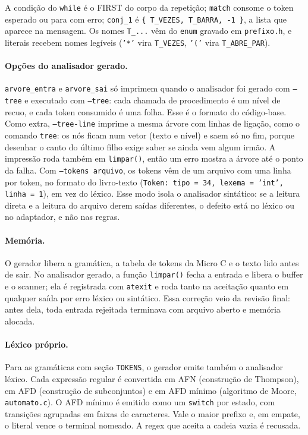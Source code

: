 \documentclass[11pt,a4paper]{article}
\begin{document}
\noindent A condição do \texttt{while} é o FIRST do corpo da repetição; \texttt{match} consome o
token esperado ou para com erro; \texttt{conj\_1} é \texttt{\{ T\_VEZES, T\_BARRA, -1 \}}, a
lista que aparece na mensagem. Os nomes \texttt{T\_...} vêm do \texttt{enum} gravado em
\texttt{prefixo.h}, e literais recebem nomes legíveis (\texttt{'*'} vira \texttt{T\_VEZES},
\texttt{'('} vira \texttt{T\_ABRE\_PAR}).

\paragraph{Opções do analisador gerado.} \texttt{arvore\_entra} e \texttt{arvore\_sai} só imprimem
quando o analisador foi gerado com \texttt{--tree} e executado com \texttt{--tree}: cada chamada de
procedimento é um nível de recuo, e cada token consumido é uma folha. Esse é o formato do
código-base. Como extra, \texttt{--tree-line} imprime a mesma árvore com linhas de ligação, como
o comando \texttt{tree}: os nós ficam num vetor (texto e nível) e saem só no fim, porque desenhar o
canto do último filho exige saber se ainda vem algum irmão. A impressão roda também em
\texttt{limpar()}, então um erro mostra a árvore até o ponto da falha. Com \texttt{--tokens
arquivo}, os tokens vêm de um arquivo com uma linha por token, no formato do livro-texto
(\texttt{Token: tipo = 34, lexema = 'int', linha = 1}), em vez do léxico. Esse modo isola o
analisador sintático: se a leitura direta e a leitura do arquivo derem saídas diferentes, o
defeito está no léxico ou no adaptador, e não nas regras.

\paragraph{Memória.} O gerador libera a gramática, a tabela de tokens da Micro C e o texto lido
antes de sair. No analisador gerado, a função \texttt{limpar()} fecha a entrada e libera o buffer
e o scanner; ela é registrada com \texttt{atexit} e roda tanto na aceitação quanto em qualquer
saída por erro léxico ou sintático. Essa correção veio da revisão final: antes dela, toda entrada
rejeitada terminava com arquivo aberto e memória alocada.

\paragraph{Léxico próprio.} Para as gramáticas com seção \texttt{TOKENS}, o gerador emite também
o analisador léxico. Cada expressão regular é convertida em AFN (construção de Thompson), em AFD
(construção de subconjuntos) e em AFD mínimo (algoritmo de Moore, \texttt{automato.c}). O AFD
mínimo é emitido como um \texttt{switch} por estado, com transições agrupadas em faixas de
caracteres. Vale o maior prefixo e, em empate, o literal vence o terminal nomeado. A regex que
aceita a cadeia vazia é recusada.
\end{document}
